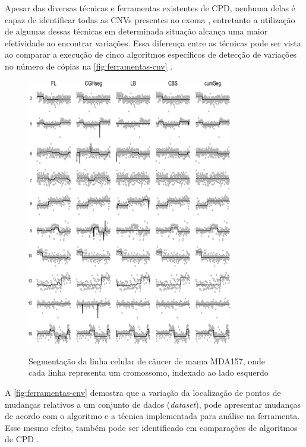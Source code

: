 Apesar das diversas técnicas e ferramentas existentes de CPD, nenhuma delas é capaz de identificar todas as CNVs presentes no exoma \cite{Zhao2013}, entretanto a utilização de algumas dessas técnicas em determinada situação alcança uma maior efetividade ao encontrar variações. Essa diferença entre as técnicas pode ser vista ao comparar a execução de cinco algoritmos específicos de detecção de variações no número de cópias na \autoref{fig:ferramentas-cnv} \cite{Muggeo2010}. 

\begin{figure}[!htb] 
\centering 
\caption{Segmentação da linha celular de câncer de mama MDA157, onde cada linha representa um cromossomo, indexado ao lado esquerdo} 
\includegraphics[width=0.8\textwidth]{./dados/figuras/ferramentas-cnv} 
\label{fig:ferramentas-cnv} 
\end{figure} 

A \autoref{fig:ferramentas-cnv} demostra que a variação da localização de pontos de mudanças relativos a um conjunto de dados (\textit{dataset}), pode apresentar mudanças de acordo com o algoritmo e a técnica implementada para análise na ferramenta. Esse mesmo efeito, também pode ser identificado em comparações de algoritmos de CPD \cite{Ducre-Robitaille2003,Reeves2007}. 


